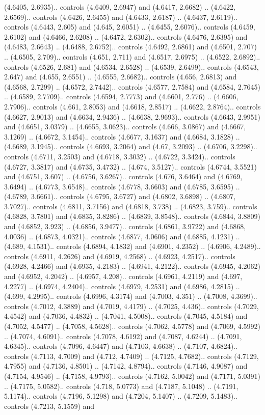 (4.6405, 2.6935).. controls (4.6409, 2.6947) and (4.6417, 2.6682) .. (4.6422, 2.6569).. controls (4.6426, 2.6455) and (4.6433, 2.6187) .. (4.6437, 2.6119).. controls (4.6443, 2.605) and (4.645, 2.6051) .. (4.6455, 2.6076).. controls (4.6459, 2.6102) and (4.6466, 2.6208) .. (4.6472, 2.6302).. controls (4.6476, 2.6395) and (4.6483, 2.6643) .. (4.6488, 2.6752).. controls (4.6492, 2.6861) and (4.6501, 2.707) .. (4.6505, 2.709).. controls (4.651, 2.711) and (4.6517, 2.6975) .. (4.6522, 2.6892).. controls (4.6526, 2.681) and (4.6534, 2.6528) .. (4.6539, 2.6499).. controls (4.6543, 2.647) and (4.655, 2.6551) .. (4.6555, 2.6682).. controls (4.656, 2.6813) and (4.6568, 2.7299) .. (4.6572, 2.7442).. controls (4.6577, 2.7584) and (4.6584, 2.7645) .. (4.6589, 2.7709).. controls (4.6594, 2.7773) and (4.6601, 2.776) .. (4.6606, 2.7906).. controls (4.661, 2.8053) and (4.6618, 2.8517) .. (4.6622, 2.8764).. controls (4.6627, 2.9013) and (4.6634, 2.9436) .. (4.6638, 2.9693).. controls (4.6643, 2.9951) and (4.6651, 3.0379) .. (4.6655, 3.0623).. controls (4.666, 3.0867) and (4.6667, 3.1269) .. (4.6672, 3.1454).. controls (4.6677, 3.1637) and (4.6684, 3.1828) .. (4.6689, 3.1945).. controls (4.6693, 3.2064) and (4.67, 3.2093) .. (4.6706, 3.2298).. controls (4.6711, 3.2503) and (4.6718, 3.3032) .. (4.6722, 3.3424).. controls (4.6727, 3.3817) and (4.6735, 3.4732) .. (4.674, 3.5127).. controls (4.6744, 3.5521) and (4.6751, 3.607) .. (4.6756, 3.6267).. controls (4.676, 3.6464) and (4.6769, 3.6494) .. (4.6773, 3.6548).. controls (4.6778, 3.6603) and (4.6785, 3.6595) .. (4.6789, 3.6661).. controls (4.6795, 3.6727) and (4.6802, 3.6898) .. (4.6807, 3.7027).. controls (4.6811, 3.7156) and (4.6818, 3.738) .. (4.6823, 3.759).. controls (4.6828, 3.7801) and (4.6835, 3.8286) .. (4.6839, 3.8548).. controls (4.6844, 3.8809) and (4.6852, 3.923) .. (4.6856, 3.9477).. controls (4.6861, 3.9722) and (4.6868, 4.0036) .. (4.6873, 4.0321).. controls (4.6877, 4.0606) and (4.6885, 4.1231) .. (4.689, 4.1531).. controls (4.6894, 4.1832) and (4.6901, 4.2352) .. (4.6906, 4.2489).. controls (4.6911, 4.2626) and (4.6919, 4.2568) .. (4.6923, 4.2517).. controls (4.6928, 4.2466) and (4.6935, 4.2183) .. (4.6941, 4.2122).. controls (4.6945, 4.2062) and (4.6952, 4.2042) .. (4.6957, 4.208).. controls (4.6961, 4.2119) and (4.697, 4.2277) .. (4.6974, 4.2404).. controls (4.6979, 4.2531) and (4.6986, 4.2815) .. (4.699, 4.2995).. controls (4.6996, 4.3174) and (4.7003, 4.351) .. (4.7008, 4.3699).. controls (4.7012, 4.3889) and (4.7019, 4.4179) .. (4.7025, 4.436).. controls (4.7029, 4.4542) and (4.7036, 4.4832) .. (4.7041, 4.5008).. controls (4.7045, 4.5184) and (4.7052, 4.5477) .. (4.7058, 4.5628).. controls (4.7062, 4.5778) and (4.7069, 4.5992) .. (4.7074, 4.6091).. controls (4.7078, 4.6192) and (4.7087, 4.6244) .. (4.7091, 4.6345).. controls (4.7096, 4.6447) and (4.7103, 4.6638) .. (4.7107, 4.6824).. controls (4.7113, 4.7009) and (4.712, 4.7409) .. (4.7125, 4.7682).. controls (4.7129, 4.7955) and (4.7136, 4.8501) .. (4.7142, 4.8794).. controls (4.7146, 4.9087) and (4.7154, 4.9546) .. (4.7158, 4.9793).. controls (4.7162, 5.0042) and (4.7171, 5.0391) .. (4.7175, 5.0582).. controls (4.718, 5.0773) and (4.7187, 5.1048) .. (4.7191, 5.1174).. controls (4.7196, 5.1298) and (4.7204, 5.1407) .. (4.7209, 5.1483).. controls (4.7213, 5.1559) and 